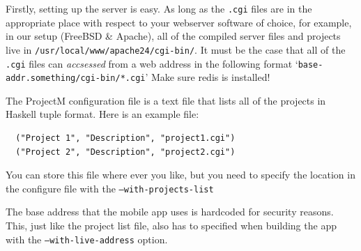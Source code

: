 \documentclass{article}
\begin{document}
Firstly, setting up the server is easy. As long as the \texttt{.cgi} files are in the appropriate place with respect
to your webserver software of choice, for example, in our setup (FreeBSD \& Apache), all of the compiled server files and
projects live in \texttt{/usr/local/www/apache24/cgi-bin/}. It must be the case that all of the \texttt{.cgi} files can 
\textit{accsessed} from a web address in the following format `\texttt{base-addr.something/cgi-bin/*.cgi}' Make sure redis is installed!

The ProjectM configuration file is a text file that lists all of the projects in Haskell tuple format.
Here is an example file:
\begin{verbatim}
  ("Project 1", "Description", "project1.cgi")
  ("Project 2", "Description", "project2.cgi")
\end{verbatim}
You can store this file where ever you like, but you need to specify the location in the configure file with the \texttt{--with-projects-list}

The base address that the mobile app uses is hardcoded for security reasons. This, just like the project list file, also has to specified when building
the app with the \texttt{--with-live-address} option.

\newpage
\end{document}
